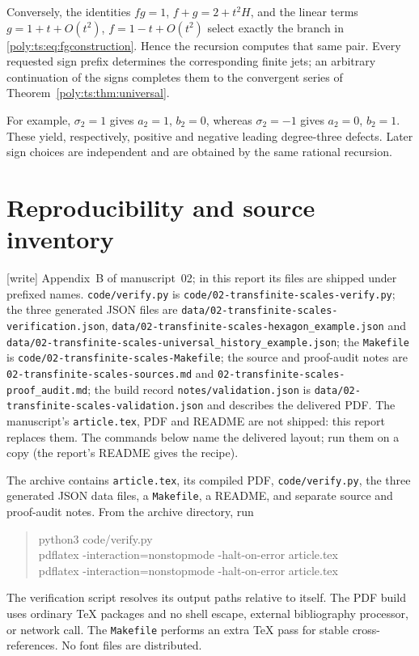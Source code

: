 \documentclass[11pt,a4paper]{article}
\numberwithin{equation}{section}
\theoremstyle{plain}
\newcommand{\wtag}{\textup{[write]}}%
\begin{document}
Conversely, the identities $fg=1$, $f+g=2+t^2H$, and the linear terms
$g=1+t+O(t^2)$, $f=1-t+O(t^2)$ select exactly the branch in
\eqref{poly:ts:eq:fgconstruction}. Hence the recursion computes that same pair.
Every requested sign prefix determines the corresponding finite jets;
an arbitrary continuation of the signs completes them to the convergent
series of Theorem~\ref{poly:ts:thm:universal}.

For example, $\sigma_2=1$ gives $a_2=1$, $b_2=0$, whereas
$\sigma_2=-1$ gives $a_2=0$, $b_2=1$. These yield, respectively,
positive and negative leading degree-three defects. Later sign choices
are independent and are obtained by the same rational recursion.

\section{Reproducibility and source inventory}\label{poly:ts:app:repro}
\noindent\wtag{} Appendix~B of manuscript~02; in this report its files are
shipped under prefixed names. \nolinkurl{code/verify.py} is
\nolinkurl{code/02-transfinite-scales-verify.py}; the three generated JSON
files are \nolinkurl{data/02-transfinite-scales-verification.json},
\nolinkurl{data/02-transfinite-scales-hexagon_example.json} and
\nolinkurl{data/02-transfinite-scales-universal_history_example.json}; the
\nolinkurl{Makefile} is \nolinkurl{code/02-transfinite-scales-Makefile};
the source and proof-audit notes are
\nolinkurl{02-transfinite-scales-sources.md} and
\nolinkurl{02-transfinite-scales-proof_audit.md}; the build record
\nolinkurl{notes/validation.json} is
\nolinkurl{data/02-transfinite-scales-validation.json} and describes the
delivered PDF. The manuscript's \nolinkurl{article.tex}, PDF and README are
not shipped: this report replaces them. The commands below name the
delivered layout; run them on a copy (the report's README gives the recipe).

The archive contains \texttt{article.tex}, its compiled PDF,
\texttt{code/verify.py}, the three generated JSON data files, a
\texttt{Makefile}, a README, and separate source and proof-audit notes.
From the archive directory, run
\begin{quote}\ttfamily
python3 code/verify.py\\
pdflatex -interaction=nonstopmode -halt-on-error article.tex\\
pdflatex -interaction=nonstopmode -halt-on-error article.tex
\end{quote}
The verification script resolves its output paths relative to itself.
The PDF build uses ordinary TeX packages and no shell escape, external
bibliography processor, or network call. The \texttt{Makefile} performs
an extra TeX pass for stable cross-references. No font files are distributed.
\end{document}
